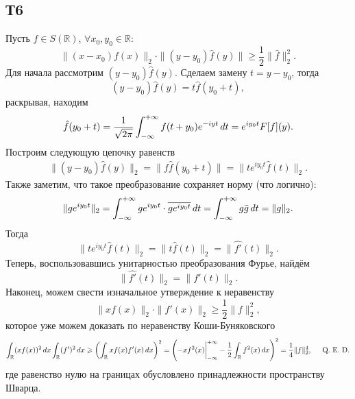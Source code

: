 \subsection{Т6}

Пусть $f \in S(\mathbb{R})$, $\forall x_0, y_0  \in \mathbb{R}$:
\begin{equation*}
    \|(x-x_0) f(x) \|_2 \cdot \|(y-y_0) \hat{f} (y)\| \geq \frac{1}{2} \|\hat{f}\|_2^2.
\end{equation*}
Для начала рассмотрим $(y-y_0) \hat{f} (y)$. Сделаем замену $t = y-y_0$, тогда
\begin{equation*}
    (y-y_0) \hat{f} (y) = t \hat{f} (y_0 + t),
\end{equation*}
раскрывая, находим
\begin{equation*}
    \hat{f} (y_0 + t) = \frac{1}{\sqrt{2\pi}} \int_{-\infty}^{+\infty} f(t + y_0) e^{-iyt} \, d t =  e^{i y_0 t} F[f] (y).
\end{equation*}
Построим следующую цепочку равенств
\begin{align*}
    \| (y-y_0) \hat{f} (y)\|_2 = \|f \hat{f} (y_0 + t)\| = \|t e^{i y_0 t} \hat{f} (t)\|_2.
\end{align*}
Также заметим, что такое преобразование сохраняет норму (что логично):
\begin{equation*}
    \|g e^{i y_0 t}\|_2 = \int_{-\infty}^{+\infty} g e^{i y_0 t} \cdot \overline{g e^{i y_0 t}} \, d t = 
    \int_{-\infty}^{+\infty}  g \bar{g} \, d t = \|g\|_2.
\end{equation*}
Тогда
\begin{equation*}
    \|t e^{i y_0 t} \hat{f} (t)\|_2 = \|t \hat{f} (t)\|_2 = \|\hat{f'} (t)\|_2.
\end{equation*}
Теперь, воспользовавшись унитарностью преобразования Фурье, найдём
\begin{equation*}
    \|\hat{f'} (t)\|_2 = \|f'(t)\|_2.
\end{equation*}
Наконец, можем свести изначальное утверждение к неравенству
\begin{equation*}
    \|x f(x)\|_2 \cdot \|f'(x)\|_2 \geq \frac{1}{2} \|f\|_2^2,
\end{equation*}
которое уже можем доказать по неравенству Коши-Буняковского
\begin{equation*}
    \int_{\mathbb{R}} (x f(x))^2 \, d x \int_{\mathbb{R}} (f')^2 \, d x \geqslant 
    \left(
        \int_{\mathbb{R}}x f(x) f' (x) \, d x
    \right)^2 = \left(
        -x f^2(x) \bigg|_{-\infty}^{+\infty} - \frac{1}{2} \int_{\mathbb{R}} f^2 (x) \, d x
    \right)^2 = \frac{1}{4} \|f\|_2^4,
    \hspace{5 mm} \textnormal{Q.\ E.\ D.}
\end{equation*}
где равенство нулю на границах обусловлено принадлежности пространству Шварца.

